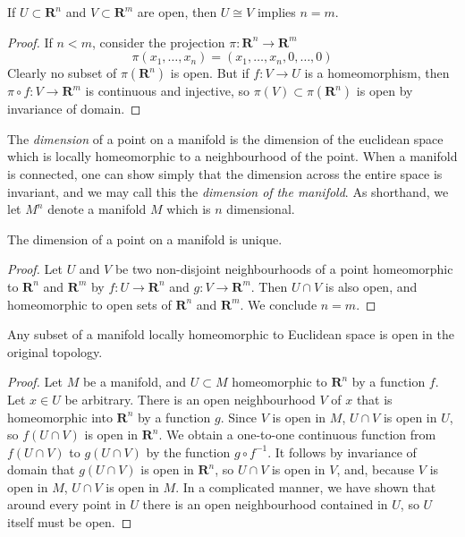 \begin{lemma}
    If $U \subset \mathbf{R}^n$ and $V \subset \mathbf{R}^m$ are open, then $U \cong V$ implies $n = m$.
\end{lemma}
\begin{proof}
    If $n < m$, consider the projection $\pi: \mathbf{R}^n \to \mathbf{R}^m$
    \[ \pi(x_1, \dots, x_n) = (x_1, \dots, x_n, 0, \dots, 0) \]
    Clearly no subset of $\pi(\mathbf{R}^n)$ is open. But if $f: V \to U$ is a homeomorphism, then $\pi \circ f: V \to \mathbf{R}^m$ is continuous and injective, so $\pi(V) \subset \pi(\mathbf{R}^n)$ is open by invariance of domain.
\end{proof}

The \emph{dimension} of a point on a manifold is the dimension of the euclidean space which is locally homeomorphic to a neighbourhood of the point. When a manifold is connected, one can show simply that the dimension across the entire space is invariant, and we may call this the \emph{dimension of the manifold}. As shorthand, we let $M^n$ denote a manifold $M$ which is $n$ dimensional.

\begin{corollary}
    The dimension of a point on a manifold is unique.
\end{corollary}
\begin{proof}
    Let $U$ and $V$ be two non-disjoint neighbourhoods of a point homeomorphic to $\mathbf{R}^n$ and $\mathbf{R}^m$ by $f:U \to \mathbf{R}^n$ and $g:V \to \mathbf{R}^m$. Then $U \cap V$ is also open, and homeomorphic to open sets of $\mathbf{R}^n$ and $\mathbf{R}^m$. We conclude $n = m$.
\end{proof}

\begin{theorem}
    Any subset of a manifold locally homeomorphic to Euclidean space is open in the original topology.
\end{theorem}
\begin{proof}
    Let $M$ be a manifold, and $U \subset M$ homeomorphic to $\mathbf{R}^n$ by a function $f$. Let $x \in U$ be arbitrary. There is an open neighbourhood $V$ of $x$ that is homeomorphic into $\mathbf{R}^n$ by a function $g$. Since $V$ is open in $M$, $U \cap V$ is open in $U$, so $f(U \cap V)$ is open in $\mathbf{R}^n$. We obtain a one-to-one continuous function from $f(U \cap V)$ to $g(U \cap V)$ by the function $g \circ f^{-1}$. It follows by invariance of domain that $g(U \cap V)$ is open in $\mathbf{R}^n$, so $U \cap V$ is open in $V$, and, because $V$ is open in $M$, $U \cap V$ is open in $M$. In a complicated manner, we have shown that around every point in $U$ there is an open neighbourhood contained in $U$, so $U$ itself must be open.
\end{proof}


